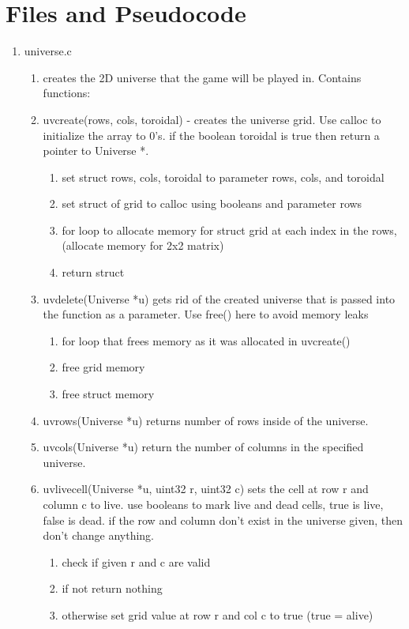 \documentclass[11pt]{article}
\begin{document}
\section{Files and Pseudocode}\label{ss:files}
\begin{enumerate}
	\item universe.c
	\begin{enumerate}
		\item creates the 2D universe that the game will be played in. Contains functions:
		\item uvcreate(rows, cols, toroidal) - creates the universe grid. Use calloc to initialize the array to 0's. if the boolean toroidal is true then return a pointer to Universe *. 
			\begin{enumerate}
			\item set struct rows, cols, toroidal to parameter rows, cols, and toroidal
			\item set struct of grid to calloc using booleans and parameter rows
			\item for loop to allocate memory for struct grid at each index in the rows, (allocate memory for 2x2 matrix)
			\item return struct
			\end{enumerate}
		\item uvdelete(Universe *u) gets rid of the created universe that is passed into the function as a parameter. Use free() here to avoid memory leaks
			\begin{enumerate}
			\item for loop that frees memory as it was allocated in uvcreate()
			\item free grid memory
			\item free struct memory
			\end{enumerate}
		\item uvrows(Universe *u) returns number of rows inside of the universe.
		\item uvcols(Universe *u) return the number of columns in the specified universe.
		\item uvlivecell(Universe *u, uint32 r, uint32 c) sets the cell at row r and column c to live. use booleans to mark live and dead cells, true is live, false is dead. if the row and column don't exist in the universe given, then don't change anything.
			\begin{enumerate}
			\item check if given r and c are valid
			\item if not return nothing
			\item otherwise set grid value at row r and col c to true (true = alive)

\end{enumerate}
\end{enumerate}
\end{enumerate}
\end{document}
